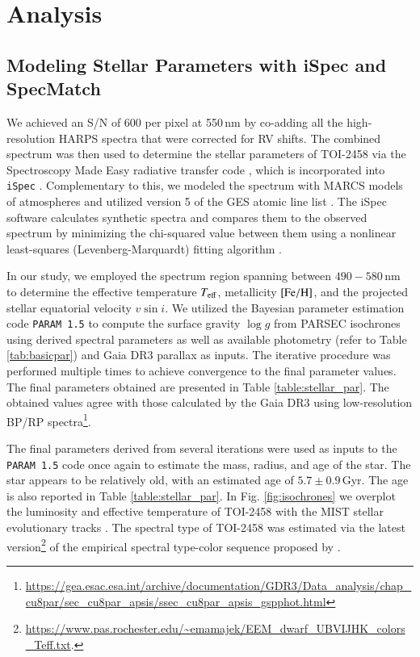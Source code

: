 \documentclass[traditabstract,longauth]{aa}
\begin{document}
%
%

\section{Analysis} \label{sec:analysis}

\subsection{Modeling Stellar Parameters with iSpec and SpecMatch} \label{st_par}

We achieved an S/N of 600 per pixel at 550\,nm by co-adding all the high-resolution HARPS spectra that were corrected for RV shifts. The combined spectrum was then used to determine the stellar parameters of TOI-2458 via the Spectroscopy Made Easy radiative transfer code \citep[{\tt SME};][]{Valenti96,Piskunov17}, which is incorporated into {\tt iSpec} \citep{Blanco14,Blanco19}. Complementary to this, we modeled the spectrum with MARCS models of atmospheres \citep{Gustafsson08} and utilized version 5 of the GES atomic line list \citep{Heiter15}. The iSpec software calculates synthetic spectra and compares them to the observed spectrum by minimizing the chi-squared value between them using a nonlinear least-squares (Levenberg-Marquardt) fitting algorithm \citep{Markwardt09}.

In our study, we employed the spectrum region spanning between $490-580$\,nm to determine the effective temperature $T_{\rm eff}$, metallicity $\rm [Fe/H]$, and the projected stellar equatorial velocity $v\sin{i}$. We utilized the Bayesian parameter estimation code {\tt PARAM 1.5} \citep{DaSilva06,Rodrigues14,Rodrigues17} to compute the surface gravity $\log{g}$ from PARSEC isochrones \citep{Bressan12} using derived spectral parameters as well as available photometry (refer to Table \ref{tab:basicpar}) and Gaia DR3 parallax as inputs. The iterative procedure was performed multiple times to achieve convergence to the final parameter values. The final parameters obtained are presented in Table \ref{table:stellar_par}. The obtained values agree with those calculated by the Gaia DR3 using low-resolution BP/RP spectra\footnote{\url{https://gea.esac.esa.int/archive/documentation/GDR3/Data_analysis/chap_cu8par/sec_cu8par_apsis/ssec_cu8par_apsis_gspphot.html}}.

The final parameters derived from several iterations were used as inputs to the {\tt PARAM 1.5} code once again to estimate the mass, radius, and age of the star. The star appears to be relatively old, with an estimated age of $5.7\pm0.9$\,Gyr. The age is also reported in Table \ref{table:stellar_par}. In Fig. \ref{fig:isochrones} we overplot the luminosity and effective temperature of TOI-2458 with the MIST stellar evolutionary tracks \citep{Choi16}. The spectral type of TOI-2458 was estimated via the latest version\footnote{\url{https://www.pas.rochester.edu/~emamajek/EEM_dwarf_UBVIJHK_colors_Teff.txt}.} of the empirical spectral type-color sequence proposed by \cite{Pecaut13}.
\end{document}

